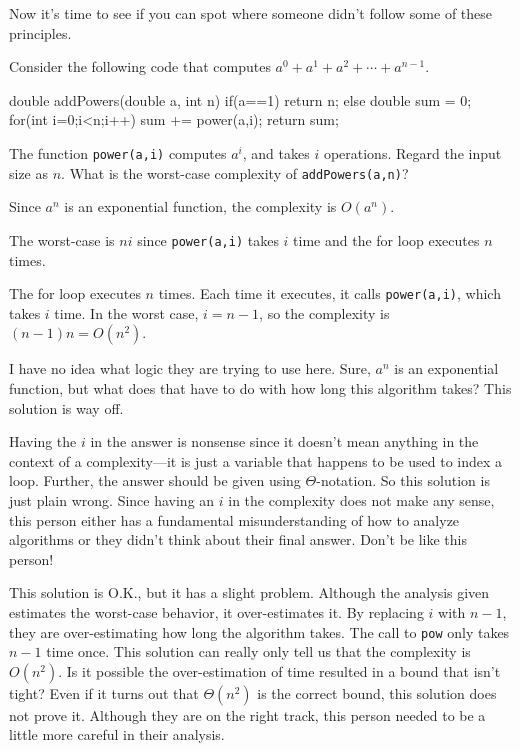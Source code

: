 Now it's time to see if you can spot where someone didn't follow some of these principles.

\newpage

\begin{eval}\label{eval:addpow}
Consider the following code that computes $a^0+a^1+a^2+\cdots+a^{n-1}$.
\begin{code}
	  double addPowers(double a, int n) {
	      if(a==1) {
	          return n;
	      } else {
	          double sum = 0;
	          for(int i=0;i<n;i++) {
	              sum += power(a,i); 
	          }
	          return sum;
	      }
	  }
\end{code}  
The function \verb+power(a,i)+ computes $a^i$, and takes $i$ operations.
Regard the input size as $n$.
What is the worst-case complexity of \verb+addPowers(a,n)+?
\begin{ssolenum}
\item
Since $a^n$ is an exponential function, the complexity is $O(a^n)$.

\noindent
\evallinethree
\item
The worst-case is $n i$ since \verb+power(a,i)+ takes $i$ time and the for loop
executes $n$ times.

\noindent
\evallinethree
\item
The for loop executes $n$ times.  Each time it executes, it calls \verb+power(a,i)+,
which takes $i$ time.  In the worst case, $i=n-1$, so the complexity is
$(n-1)n=O(n^2)$.

\noindent
\evallinethree
\end{ssolenum}
\begin{answer}
\begin{solevalenum}
\item
I have no idea what logic they are trying to use here.  Sure, $a^n$ is an exponential
function, but what does that have to do with how long this algorithm takes?
This solution is way off.
\item
Having the $i$ in the answer is nonsense since it doesn't mean
anything in the context of a complexity---it is just a variable that happens to be
used to index a loop.  Further, the answer should be given using
$\Theta$-notation.  So this solution is just plain wrong.
Since having an $i$ in the complexity does not make any sense, this person either
has a fundamental misunderstanding of how to analyze algorithms or they didn't 
think about their final answer.  Don't be like this person!
\item
This solution is O.K., but it has a slight problem.  Although the analysis given estimates
the worst-case behavior, it over-estimates it.  By replacing $i$ with $n-1$, they are
over-estimating how long the algorithm takes. 
The call to \verb+pow+ only takes $n-1$ time once.
This solution can really only tell us
that the complexity is $O(n^2)$.  Is it possible the over-estimation of time resulted
in a bound that isn't tight?  Even if it turns out that $\Theta(n^2)$ is the correct bound,
this solution does not prove it.
Although they are on the right track, 
this person needed to be a little more careful in their analysis.
\end{solevalenum}
\end{answer}
\end{eval}


